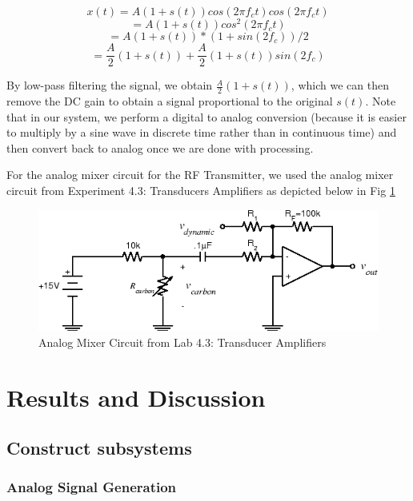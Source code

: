 \documentclass[10pt]{article}
\begin{document}
$$ x(t) = A(1 + s(t))cos(2\pi f_c  t)  cos(2  \pi  f_c  t)$$
$$ = A(1 + s(t))cos^2(2  \pi  f_c  t)$$
$$ = A(1 + s(t)) * (1 + sin(2f_c))/2$$
$$ = \frac{A}{2}(1 + s(t)) + \frac{A}{2}(1 + s(t))  sin(2f_c)$$

By low-pass filtering the signal, we obtain $ \frac{A}{2}(1 + s(t))$, which we can then remove the DC gain to obtain a signal proportional to the original $s(t)$. Note that in our system, we perform a digital to analog conversion (because it is easier to multiply by a sine wave in discrete time rather than in continuous time) and then convert back to analog once we are done with processing.  



\noindent
For the analog mixer circuit for the RF Transmitter, we used the analog mixer circuit from Experiment 4.3: Transducers Amplifiers as depicted below in Fig \ref{fig:analogmixer}

\begin{center}
	\begin{figure}[H]
		\centering
		\includegraphics[scale = 0.5]{images/analogmixer.png}
		\caption{Analog Mixer Circuit from Lab 4.3: Transducer Amplifiers}
		\label{fig:analogmixer}
	\end{figure}
\end{center}

\medskip


\section{Results and Discussion}

\subsection{Construct subsystems}

\subsubsection{Analog Signal Generation}
\end{document}
